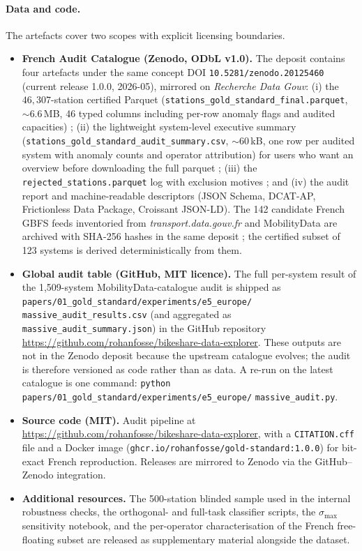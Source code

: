 \documentclass[11pt,a4paper]{article}
\begin{document}
\paragraph{Data and code.}
The artefacts cover two scopes with explicit licensing boundaries.
\begin{itemize}[leftmargin=*]
\item \textbf{French Audit Catalogue (Zenodo, ODbL v1.0).} The
deposit contains four artefacts under the same concept DOI
\texttt{10.5281/zenodo.20125460} (current release 1.0.0,
2026-05), mirrored on \emph{Recherche Data Gouv}:
(i) the $46{,}307$-station certified Parquet
(\texttt{stations\_gold\_standard\_final.parquet}, $\sim 6.6$\,MB,
46 typed columns including per-row anomaly flags and audited
capacities) ;
(ii) the lightweight system-level executive summary
(\texttt{stations\_gold\_standard\_audit\_summary.csv}, $\sim$60\,kB,
one row per audited system with anomaly counts and operator
attribution) for users who want an overview before downloading the
full parquet ;
(iii) the \texttt{rejected\_stations.parquet} log with exclusion
motives ; and
(iv) the audit report and machine-readable descriptors
(JSON Schema, DCAT-AP, Frictionless Data Package, Croissant JSON-LD).
The 142 candidate French GBFS feeds inventoried from
\emph{transport.data.gouv.fr} and MobilityData are archived with
SHA-256 hashes in the same deposit ; the certified subset of 123
systems is derived deterministically from them.
\item \textbf{Global audit table (GitHub, MIT licence).} The full
per-system result of the 1{,}509-system MobilityData-catalogue audit
is shipped as \texttt{papers/01\_gold\_standard/experiments/e5\_europe/}\linebreak
\texttt{massive\_audit\_results.csv} (and aggregated as
\texttt{massive\_audit\_summary.json}) in the GitHub repository
\url{https://github.com/rohanfosse/bikeshare-data-explorer}. These
outputs are not in the Zenodo deposit because the upstream
catalogue evolves; the audit is therefore versioned as code rather
than as data. A re-run on the latest catalogue is one command:
\texttt{python papers/01\_gold\_standard/experiments/e5\_europe/}\linebreak
\texttt{massive\_audit.py}.
\item \textbf{Source code (MIT).} Audit pipeline at
\url{https://github.com/rohanfosse/bikeshare-data-explorer}, with a
\texttt{CITATION.cff} file and a Docker image
(\texttt{ghcr.io/rohanfosse/gold-standard:1.0.0}) for bit-exact
French reproduction. Releases are mirrored to Zenodo via the
GitHub--Zenodo integration.
\item \textbf{Additional resources.} The 500-station blinded sample
used in the internal robustness checks, the orthogonal- and full-task
classifier scripts, the $\sigma_{\max}$ sensitivity notebook, and the
per-operator characterisation of the French free-floating subset
are released as supplementary material alongside the dataset.
\end{itemize}
\end{document}
